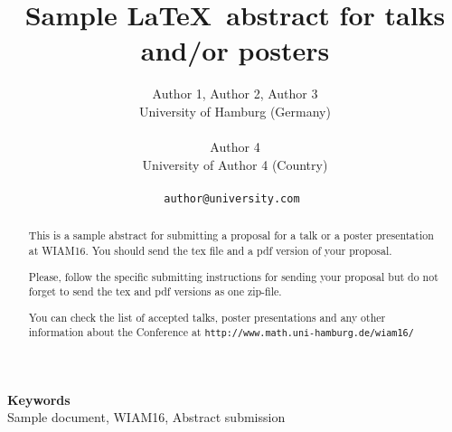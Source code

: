 \documentclass[a4paper]{article} %
\date{} %
\def\keywords#1{\begin{center}{\bf Keywords}\\{#1}\end{center}} %
\begin{document}
\title{Sample \LaTeX\ abstract for talks and/or posters}

\author{Author 1, Author 2, Author 3 \\ %
       University of Hamburg (Germany) \\ \\ %
       Author 4 \\ %
       University of Author 4 (Country) \\ \\ %
       \tt{author@university.com} %
       }%


\maketitle

\thispagestyle{empty}




\begin{abstract}
This is a sample abstract for submitting a proposal for a talk or a poster presentation at WIAM16. You
should send the tex file and a pdf version of your proposal.

Please, follow the specific submitting instructions for sending your proposal but do not forget to
send the tex and pdf versions as one zip-file.

You can check the list of accepted talks, poster presentations and any other information about the Conference
at {\tt http://www.math.uni-hamburg.de/wiam16/}

\end{abstract}

\keywords{Sample document, WIAM16, Abstract submission} %






\end{document}
